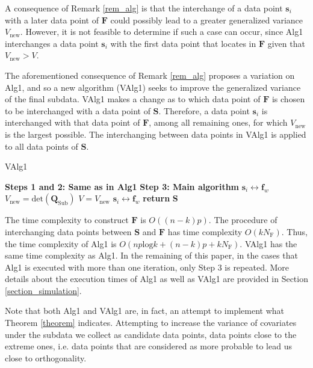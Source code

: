 \documentclass[12pt]{article}
\theoremstyle{definition}
\begin{document}
	A consequence of Remark \ref{rem_alg} is that the interchange of a data point $\textbf{s}_i$ with a later data point of $\textbf{F}$ could possibly lead to a greater generalized variance $V_{\text{new}}$. However, it is not feasible to determine if such a case can occur, since Alg1 interchanges a data point $\textbf{s}_i$ with the first data point that locates in $\textbf{F}$ given that $V_\text{new}>V$.
	
	The aforementioned consequence of Remark \ref{rem_alg} proposes a variation on Alg1, and so a new algorithm (VAlg1) seeks to improve the generalized variance of the final subdata. VAlg1 makes a change as to which data point of $\textbf{F}$ is chosen to be interchanged with a data point of $\textbf{S}$. Therefore, a data point $\textbf{s}_i$ is interchanged with that data point of $\textbf{F}$, among all remaining ones, for which $V_\text{new}$ is the largest possible. The interchanging between data points in VAlg1 is applied to all data points of $\textbf{S}$.
	
	\begin{algorithm}[H]
		\caption{VAlg1}
		\begin{algorithmic}
			\State \textbf{Steps 1 and 2: Same as in Alg1}
			\State \textbf{Step 3: Main algorithm}
			\State $\textbf{s}_i\leftrightarrow\textbf{f}_w$ 
			\State $V_{\text{new}}=\text{det}\left(\textbf{Q}_{\text{Sub}}\right)$  
			\State $V=V_\text{new}$
			\Else
			\State $\textbf{s}_i\leftrightarrow\textbf{f}_w$
			\EndIf
			\EndFor
			\EndFor
			\State \textbf{return} \textbf{S}
		\end{algorithmic}
	\end{algorithm}
	
	The time complexity to construct $\textbf{F}$ is $O((n-k)p)$. The procedure of interchanging data points between $\textbf{S}$ and $\textbf{F}$ has time complexity $O(kN_{\text{F}})$. Thus, the time complexity of Alg1 is $O(np\text{log}k+(n-k)p+kN_{\text{F}})$. VAlg1 has the same time complexity as Alg1. 
	In the remaining of this paper, in the cases that Alg1 is executed with more than one iteration, only Step 3 is repeated. More details about the execution times of Alg1 as well as VAlg1 are provided in Section \ref{section_simulation}.
	
	Note that both Alg1 and VAlg1 are, in fact, an  attempt to implement what Theorem \ref{theorem} indicates. Attempting to increase the variance of  covariates under the subdata we collect as candidate data points, data points close to the extreme ones, i.e. data points that are considered as more probable to lead us close  to orthogonality. 
	
\end{document}
